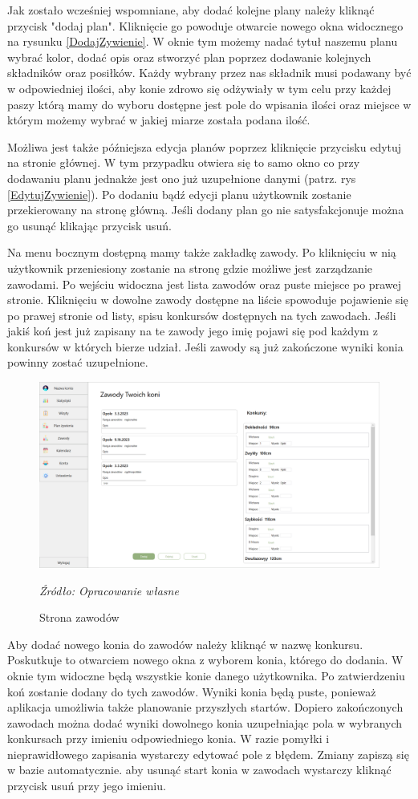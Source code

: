 \documentclass[12pt,oneside]{report}
\begin{document}
Jak zostało wcześniej wspomniane, aby dodać kolejne plany należy kliknąć przycisk "dodaj plan". Kliknięcie go powoduje otwarcie nowego okna widocznego na rysunku \ref{DodajZywienie}. W oknie tym możemy nadać tytuł naszemu planu wybrać kolor, dodać opis oraz stworzyć plan poprzez dodawanie kolejnych składników oraz posiłków.  Każdy wybrany przez nas składnik musi podawany być w odpowiedniej ilości, aby konie zdrowo się odżywiały w tym celu przy każdej paszy którą mamy do wyboru dostępne jest pole do wpisania ilości oraz miejsce w którym możemy wybrać w jakiej miarze została podana ilość. 

Możliwa jest także późniejsza edycja planów poprzez kliknięcie przycisku edytuj na stronie głównej. W tym przypadku otwiera się to samo okno co przy dodawaniu planu jednakże jest ono już uzupełnione danymi (patrz. rys \ref{EdytujZywienie}). Po dodaniu bądź edycji planu użytkownik zostanie przekierowany na stronę główną. Jeśli dodany plan go nie satysfakcjonuje można go usunąć klikając przycisk usuń.


Na menu bocznym dostępną mamy także zakładkę zawody. Po kliknięciu w nią użytkownik przeniesiony zostanie na stronę gdzie możliwe jest zarządzanie zawodami. Po wejściu widoczna jest lista zawodów oraz puste miejsce po prawej stronie. Kliknięciu w dowolne zawody dostępne na liście spowoduje pojawienie się po prawej stronie od listy, spisu konkursów dostępnych na tych zawodach. Jeśli jakiś koń jest już zapisany na te zawody jego imię pojawi się pod każdym z konkursów w których bierze udział. Jeśli zawody są już zakończone wyniki konia powinny zostać uzupełnione. 
\begin{figure}[h]
\centering
\includegraphics[scale=0.4]{zawody}
\caption{Strona zawodów}
\textit{Źródło: Opracowanie własne}
\label{StronaZawodow}
\end{figure}
Aby dodać nowego konia do zawodów należy kliknąć w nazwę konkursu. Poskutkuje to otwarciem nowego okna z wyborem konia, którego do dodania. W oknie tym widoczne będą wszystkie konie danego użytkownika. Po zatwierdzeniu koń zostanie dodany do tych zawodów. Wyniki konia będą puste, ponieważ aplikacja umożliwia także planowanie przyszłych startów. Dopiero zakończonych zawodach można dodać wyniki dowolnego konia uzupełniając pola w wybranych konkursach przy imieniu odpowiedniego konia. W razie pomyłki i nieprawidłowego zapisania wystarczy edytować pole z błędem. Zmiany zapiszą  się w bazie automatycznie. aby usunąć start konia w zawodach wystarczy kliknąć przycisk usuń przy jego imieniu.
\end{document}
